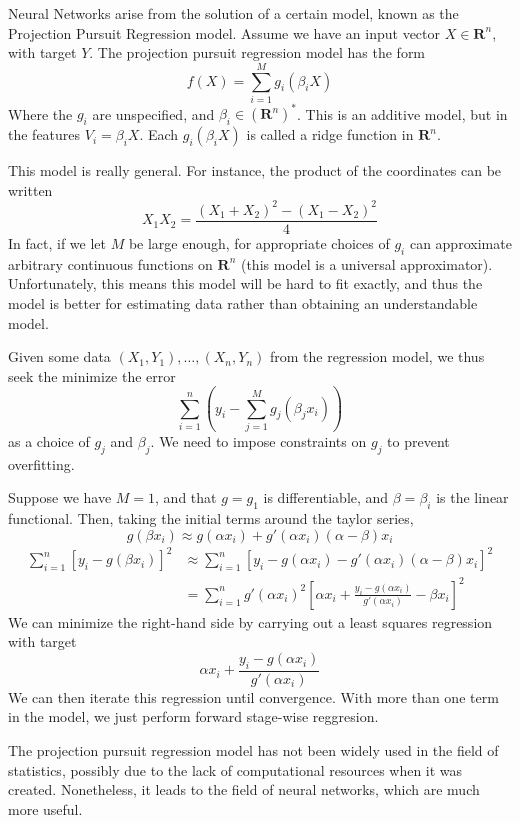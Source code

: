 Neural Networks arise from the solution of a certain model, known as the Projection Pursuit Regression model. Assume we have an input vector $X \in \mathbf{R}^n$, with target $Y$. The projection pursuit regression model has the form
%
\[ f(X) = \sum_{i = 1}^M g_i(\beta_i X) \]
%
Where the $g_i$ are unspecified, and $\beta_i \in (\mathbf{R}^n)^*$. This is an additive model, but in the features $V_i = \beta_i X$. Each $g_i(\beta_i X)$ is called a ridge function in $\mathbf{R}^n$.

This model is really general. For instance, the product of the coordinates can be written
%
\[ X_1X_2 = \frac{(X_1 + X_2)^2 - (X_1 - X_2)^2}{4} \]
%
In fact, if we let $M$ be large enough, for appropriate choices of $g_i$ can approximate arbitrary continuous functions on $\mathbf{R}^n$ (this model is a universal approximator). Unfortunately, this means this model will be hard to fit exactly, and thus the model is better for estimating data rather than obtaining an understandable model.

Given some data $(X_1, Y_1), \dots, (X_n, Y_n)$ from the regression model, we thus seek the minimize the error
%
\[ \sum_{i = 1}^n \left(y_i - \sum_{j = 1}^M g_j(\beta_j x_i) \right) \]
%
as a choice of $g_j$ and $\beta_j$. We need to impose constraints on $g_j$ to prevent overfitting.

Suppose we have $M = 1$, and that $g = g_1$ is differentiable, and $\beta = \beta_i$ is the linear functional. Then, taking the initial terms around the taylor series,
%
\[ g(\beta x_i) \approx g(\alpha x_i) + g'(\alpha x_i) (\alpha - \beta)x_i \]
%
\begin{align*}
    \sum_{i = 1}^n [y_i - g(\beta x_i)]^2 &\approx \sum_{i = 1}^n [y_i - g(\alpha x_i) - g'(\alpha x_i)(\alpha - \beta)x_i]^2\\
    &= \sum_{i = 1}^n g'(\alpha x_i)^2 \left[ \alpha x_i +  \frac{y_i - g(\alpha x_i)}{g'(\alpha x_i)} - \beta x_i \right]^2
\end{align*}
%
We can minimize the right-hand side by carrying out a least squares regression with target
%
\[ \alpha x_i + \frac{y_i - g(\alpha x_i)}{g'(\alpha x_i)} \]
%
We can then iterate this regression until convergence. With more than one term in the model, we just perform forward stage-wise reggresion.

The projection pursuit regression model has not been widely used in the field of statistics, possibly due to the lack of computational resources when it was created. Nonetheless, it leads to the field of neural networks, which are much more useful.

